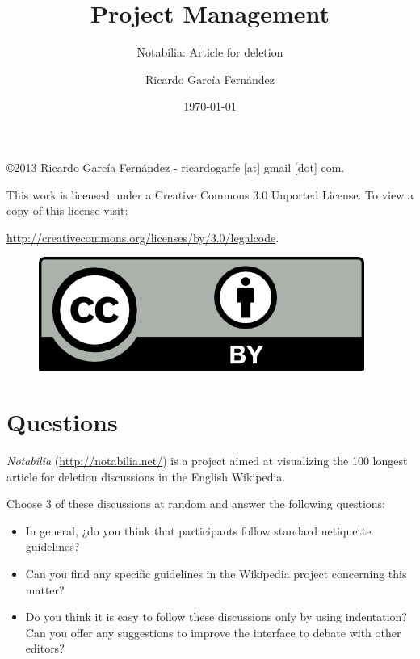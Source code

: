 \documentclass[11pt]{scrartcl}
\title{\textbf{Project Management}}
\subtitle{Notabilia: Article for deletion}
\author{Ricardo Garc\'ia Fern\'andez}
\date{\today}
\begin{document}
\maketitle

\vfill

\begin{flushright}
    \copyright  2013 Ricardo Garc\'ia Fern\'andez - ricardogarfe [at] gmail [dot] com.

    This work is licensed under a Creative Commons 3.0 Unported License.
    To view a copy of this license visit:
 
    \url{http://creativecommons.org/licenses/by/3.0/legalcode}.
\end{flushright}

\begin{figure}[h]
    \begin{flushright}	
        \includegraphics{by}
        \label{fig:by}
    \end{flushright}
\end{figure}

\newpage

\section{Questions}

\par \emph{Notabilia} (\url{http://notabilia.net/}) is a project aimed at visualizing the 100 longest article for deletion discussions in the English Wikipedia.

\par Choose 3 of these discussions at random and answer the following questions:

\begin{itemize}
	\item In general, ¿do you think that participants follow standard netiquette guidelines?
	\item Can you find any specific guidelines in the Wikipedia project concerning this matter?
	\item Do you think it is easy to follow these discussions only by using indentation? Can you offer any suggestions to improve the interface to debate with other editors?
\end{itemize}
\end{document}
